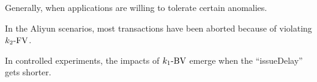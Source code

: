 % 

\begin{frame}{}
  Generally, \rvsi{} 
  when applications are willing to tolerate certain anomalies.

  \pause
  \vspace{0.6cm}
  \begin{description}[<+->]
    \setlength{\itemsep}{5pt}
    \item[$\ktwofv$:] In the Aliyun scenarios, most transactions have been aborted because of violating $\ktwofv$.
    \item[$\konebv$:] In controlled experiments, the impacts of $\konebv$ emerge when the ``issueDelay'' gets shorter.
    \item[$\kthreesv$:] 
  \end{description}
\end{frame}
